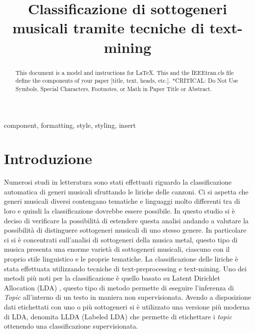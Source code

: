 \documentclass[technote]{IEEEtran}
\begin{document}
\title{Classificazione di sottogeneri musicali tramite tecniche di text-mining}

\author{
\and
{}
\and
{}
}
\maketitle

\begin{abstract}
This document is a model and instructions for \LaTeX.
This and the IEEEtran.cls file define the components of your paper [title, text, heads, etc.]. *CRITICAL: Do Not Use Symbols, Special Characters, Footnotes, 
or Math in Paper Title or Abstract.
\end{abstract}

\begin{IEEEkeywords}
component, formatting, style, styling, insert
\end{IEEEkeywords}

\section{Introduzione}
Numerosi studi in letteratura sono stati effettuati riguardo la classificazione automatica di generi musicali sfruttando le liriche delle canzoni. Ci si aspetta che generi musicali diversi contengano tematiche e linguaggi molto differenti tra di loro e quindi la classificazione dovrebbe essere possibile. In questo studio si è deciso di verificare la possibilità di estendere questa analisi andando a valutare la possibilità di distinguere sottogeneri musicali di uno stesso genere. In particolare ci si è concentrati sull'analisi di sottogeneri della musica metal, questo tipo di musica presenta una enorme varietà di sottogeneri musicali, ciascuno con il proprio stile linguistico e le proprie tematiche.
La classificazione delle liriche è stata effettuata utilizzando tecniche di text-preprocessing e text-mining. Uno dei metodi più noti per la classificazione è quello basato su Latent Dirichlet Allocation (LDA) \cite{LDA}, questo tipo di metodo permette di eseguire l'inferenza di \textit{Topic} all'interno di un testo in maniera non supervisionata.
Avendo a disposizione dati etichettati con uno o più sottogeneri si è utilizzato una versione più moderna di LDA, denomita LLDA (Labeled LDA) \cite{ramage-etal-2009-labeled} che permette di etichettare i \textit{topic} ottenendo una classificazione supervisionata.  
\end{document}
